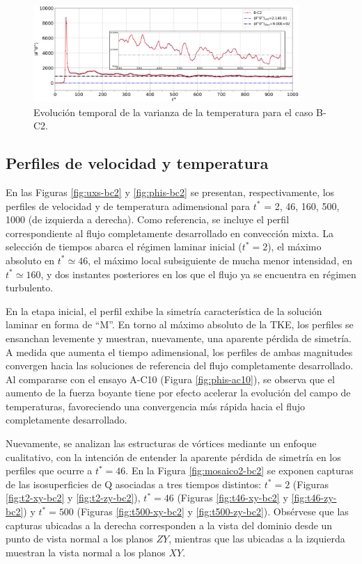 \begin{figure}[H]
  \centering      
    \includegraphics[width=0.9\textwidth]{figures/cap6/B-C2/Cases_Comp_tetavar.eps}
     \caption{Evolución temporal de la varianza de la temperatura para el caso B-C2.}
      \label{fig:tetavar-bc2}
\end{figure}

\subsection{Perfiles de velocidad y temperatura}
En las Figuras \ref{fig:uxs-bc2} y \ref{fig:phis-bc2} se presentan, respectivamente, los perfiles de velocidad y de temperatura adimensional para $t^*$ = 2, 46, 160, 500, 1000 (de izquierda a derecha). Como referencia, se incluye el perfil correspondiente al flujo completamente desarrollado en convección mixta. La selección de tiempos abarca el régimen laminar inicial ($t^* = 2$), el máximo absoluto en $t^* \simeq 46$, el máximo local subsiguiente de mucha menor intensidad, en $t^* \simeq 160$, y dos instantes posteriores en los que el flujo ya se encuentra en régimen turbulento.

En la etapa inicial, el perfil exhibe la simetría característica de la solución laminar en forma de ``M''. En torno al máximo absoluto de la TKE, los perfiles se ensanchan levemente y muestran, nuevamente, una aparente pérdida de simetría. A medida que aumenta el tiempo adimensional, los perfiles de ambas magnitudes convergen hacia las soluciones de referencia del flujo completamente desarrollado. Al compararse con el ensayo A-C10 (Figura \ref{fig:phis-ac10}), se observa que el aumento de la fuerza boyante tiene por efecto acelerar la evolución del campo de temperaturas, favoreciendo una convergencia más rápida hacia el flujo completamente desarrollado.


Nuevamente, se analizan las estructuras de vórtices mediante un enfoque cualitativo, con la intención de entender la aparente pérdida de simetría en los perfiles que ocurre a $t^* = 46$. En la Figura \ref{fig:mosaico2-bc2} se exponen capturas de las isosuperficies de Q asociadas a tres tiempos distintos: $t^* = 2$ (Figuras \ref{fig:t2-xy-bc2} y  \ref{fig:t2-zy-bc2}),  $t^* = 46$  (Figuras \ref{fig:t46-xy-bc2} y \ref{fig:t46-zy-bc2}) y  $t^* = 500$  (Figuras \ref{fig:t500-xy-bc2} y \ref{fig:t500-zy-bc2}). Obsérvese que las capturas ubicadas a la derecha corresponden a la vista del dominio desde un punto de vista normal a los planos $ZY$, mientras que las ubicadas a la izquierda muestran la vista normal a los planos $XY$.

